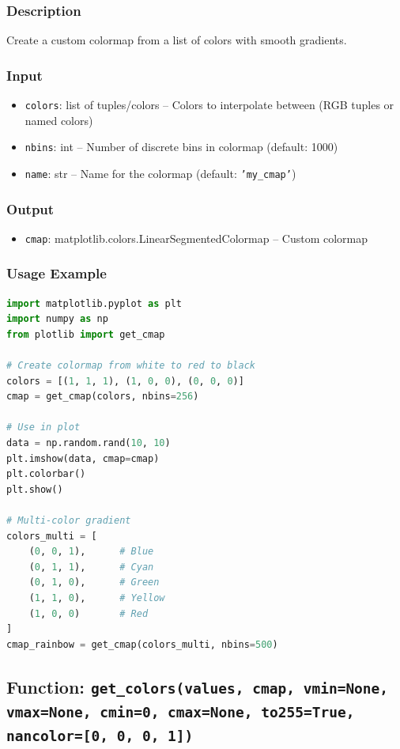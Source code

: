 \documentclass[11pt,a4paper]{article}
\begin{document}
\subsubsection{Description}
Create a custom colormap from a list of colors with smooth gradients.

\subsubsection{Input}
\begin{itemize}[leftmargin=*]
    \item \texttt{colors}: list of tuples/colors -- Colors to interpolate between (RGB tuples or named colors)
    \item \texttt{nbins}: int -- Number of discrete bins in colormap (default: 1000)
    \item \texttt{name}: str -- Name for the colormap (default: \texttt{'my\_cmap'})
\end{itemize}

\subsubsection{Output}
\begin{itemize}[leftmargin=*]
    \item \texttt{cmap}: matplotlib.colors.LinearSegmentedColormap -- Custom colormap
\end{itemize}

\subsubsection{Usage Example}
\begin{lstlisting}[language=Python, caption=Creating custom colormaps]
import matplotlib.pyplot as plt
import numpy as np
from plotlib import get_cmap

# Create colormap from white to red to black
colors = [(1, 1, 1), (1, 0, 0), (0, 0, 0)]
cmap = get_cmap(colors, nbins=256)

# Use in plot
data = np.random.rand(10, 10)
plt.imshow(data, cmap=cmap)
plt.colorbar()
plt.show()

# Multi-color gradient
colors_multi = [
    (0, 0, 1),      # Blue
    (0, 1, 1),      # Cyan
    (0, 1, 0),      # Green
    (1, 1, 0),      # Yellow
    (1, 0, 0)       # Red
]
cmap_rainbow = get_cmap(colors_multi, nbins=500)
\end{lstlisting}

\subsection{Function: \texttt{get\_colors(values, cmap, vmin=None, vmax=None, cmin=0, cmax=None, to255=True, nancolor=[0, 0, 0, 1])}}
\end{document}

